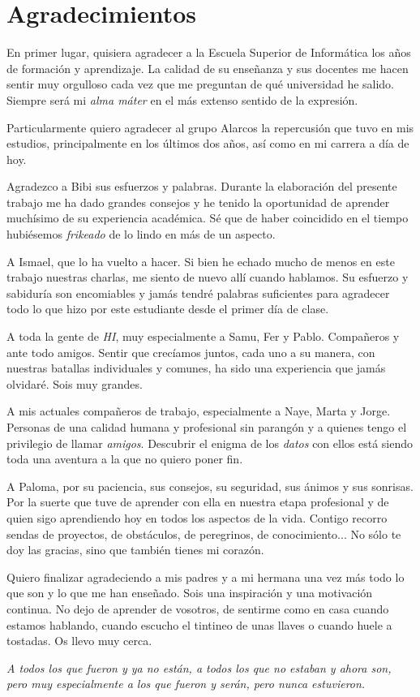 \chapter{Agradecimientos}

En primer lugar, quisiera agradecer a la Escuela Superior de Informática los
años de formación y aprendizaje. La calidad de su enseñanza y sus docentes me
hacen sentir muy orgulloso cada vez que me preguntan de qué universidad he
salido. Siempre será mi \textit{alma máter} en el más extenso sentido de la
expresión.

Particularmente quiero agradecer al grupo Alarcos la repercusión que tuvo en mis
estudios, principalmente en los últimos dos años, así como en mi carrera a día
de hoy.

Agradezco a Bibi sus esfuerzos y palabras. Durante la elaboración del presente
trabajo me ha dado grandes consejos y he tenido la oportunidad de aprender
muchísimo de su experiencia académica. Sé que de haber coincidido en el tiempo
hubiésemos \textit{frikeado} de lo lindo en más de un aspecto. 

A Ismael, que lo ha vuelto a hacer. Si bien he echado mucho de menos
en este trabajo nuestras charlas, me siento de nuevo allí cuando hablamos.
Su esfuerzo y sabiduría son encomiables y jamás tendré palabras suficientes 
para agradecer todo lo que hizo por este estudiante desde el primer día de
clase.

A toda la gente de \textit{HI}, muy especialmente a Samu, Fer y Pablo. Compañeros
y ante todo amigos. Sentir que crecíamos juntos, cada uno a su manera, con
nuestras batallas individuales y comunes, ha sido una experiencia que jamás
olvidaré. Sois muy grandes.

A mis actuales compañeros de trabajo, especialmente a Naye, Marta y Jorge.
Personas de una calidad humana y profesional sin parangón y a quienes tengo el
privilegio de llamar \textit{amigos}. Descubrir el enigma de los \textit{datos} con ellos
está siendo toda una aventura a la que no quiero poner fin. 

A Paloma, por su paciencia, sus consejos, su seguridad, sus ánimos y sus
sonrisas.  Por la suerte que tuve de aprender con ella en nuestra etapa profesional y de quien sigo
aprendiendo hoy en todos los aspectos de la vida. Contigo recorro sendas de proyectos, de obstáculos, de
peregrinos, de conocimiento... No sólo te doy las gracias, sino que también tienes mi corazón. 

Quiero finalizar agradeciendo a mis padres y a mi hermana una vez más todo lo que son y lo que
me han enseñado. Sois una inspiración y una motivación continua. No dejo de
aprender de vosotros, de sentirme como en casa cuando estamos hablando, cuando escucho
el tintineo de unas llaves o cuando huele a tostadas. Os llevo muy cerca.

\textit{A todos los que fueron y ya no están, a todos los que no estaban y ahora son,
pero muy especialmente a los que fueron y serán, pero nunca estuvieron.}


